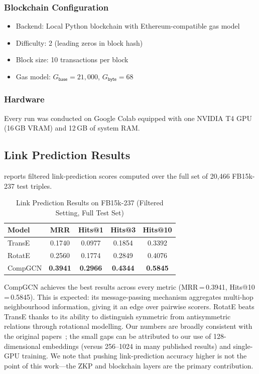 \documentclass[conference, 10pt]{IEEEtran}
\begin{document}
\subsubsection{Blockchain Configuration}
\begin{itemize}
    \item Backend: Local Python blockchain with Ethereum-compatible gas model
    \item Difficulty: 2 (leading zeros in block hash)
    \item Block size: 10 transactions per block
    \item Gas model: $G_{\mathsf{base}} = 21{,}000$, $G_{\mathsf{byte}} = 68$
\end{itemize}

\subsubsection{Hardware}
Every run was conducted on Google Colab equipped with one NVIDIA T4 GPU (16\,GB VRAM) and 12\,GB of system RAM.

\subsection{Link Prediction Results}

 reports filtered link-prediction scores computed over the full set of 20,466 FB15k-237 test triples.

\begin{table}[h]
\centering
\caption{Link Prediction Results on FB15k-237 (Filtered Setting, Full Test Set)}
\label{tab:link_prediction}
\begin{tabular}{lcccc}
\toprule
\textbf{Model} & \textbf{MRR} & \textbf{Hits@1} & \textbf{Hits@3} & \textbf{Hits@10} \\
\midrule
TransE  & 0.1740 & 0.0977 & 0.1854 & 0.3392 \\
RotatE  & 0.2560 & 0.1774 & 0.2849 & 0.4076 \\
CompGCN & \textbf{0.3941} & \textbf{0.2966} & \textbf{0.4344} & \textbf{0.5845} \\
\bottomrule
\end{tabular}
\end{table}

CompGCN achieves the best results across every metric (MRR\,=\,0.3941, Hits@10\,=\,0.5845). This is expected: its message-passing mechanism aggregates multi-hop neighbourhood information, giving it an edge over pairwise scorers. RotatE beats TransE thanks to its ability to distinguish symmetric from antisymmetric relations through rotational modelling. Our numbers are broadly consistent with the original papers~\cite{bordes2013translating, sun2019rotate, vashishth2020composition}; the small gaps can be attributed to our use of 128-dimensional embeddings (versus 256--1024 in many published results) and single-GPU training. We note that pushing link-prediction accuracy higher is not the point of this work---the ZKP and blockchain layers are the primary contribution.
\end{document}
